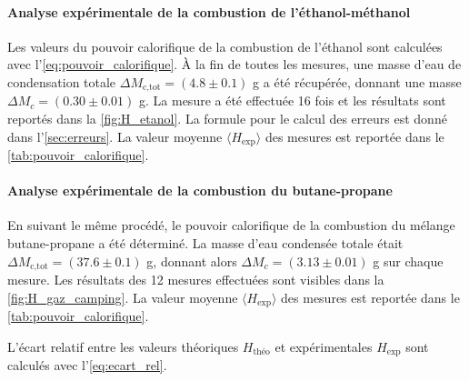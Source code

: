 \paragraph*{Analyse expérimentale de la combustion de l'éthanol-méthanol}
Les valeurs du pouvoir calorifique de la combustion de l'éthanol sont calculées avec l'\autoref{eq:pouvoir_calorifique}. À la fin de toutes les mesures, une masse d'eau de condensation totale \(\Delta M_\textrm{c,tot} = (4.8 \pm 0.1)\) \si{\gram} a été récupérée, donnant une masse \(\Delta M_c = (0.30 \pm 0.01)\) \si{\gram}. La mesure a été effectuée 16 fois et les résultats sont reportés dans la \autoref{fig:H_etanol}. La formule pour le calcul des erreurs est donné dans l'\autoref{sec:erreurs}. La valeur moyenne \(\langle H_\textrm{exp} \rangle\) des mesures est reportée dans le \autoref{tab:pouvoir_calorifique}.

\paragraph*{Analyse expérimentale de la combustion du butane-propane}
En suivant le même procédé, le pouvoir calorifique de la combustion du mélange butane-propane a été déterminé. La masse d'eau condensée totale était \(\Delta M_\textrm{c,tot} = (37.6 \pm 0.1)\) \si{\gram}, donnant alors \(\Delta M_c = (3.13 \pm 0.01)\) \si{\gram} sur chaque mesure. Les résultats des 12 mesures effectuées sont visibles dans la \autoref{fig:H_gaz_camping}. La valeur moyenne \(\langle H_\textrm{exp} \rangle\) des mesures est reportée dans le \autoref{tab:pouvoir_calorifique}.

L'écart relatif entre les valeurs théoriques \(H_\textrm{théo}\) et expérimentales \(H_\textrm{exp}\) sont calculés avec l'\autoref{eq:ecart_rel}.

